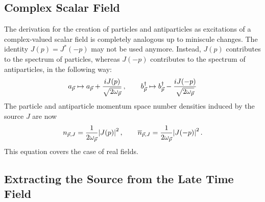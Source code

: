 \subsection{Complex Scalar Field}

The derivation for the creation of particles and antiparticles as excitations of a complex-valued scalar field is completely analogous up to miniscule changes. The identity ${J(p)=J^*(-p)}$ may not be used anymore. Instead, $J(p)$ contributes to the spectrum of particles, whereas $J(-p)$ contributes to the spectrum of antiparticles, in the following way:
\begin{equation}
    a_{\vec{p}}\mapsto a_{\vec{p}}+\frac{{i} J(p)}{\sqrt{2\omega_{\vec{p}}}}\,,\qquad b_{\vec{p}}^\dagger\mapsto b_{\vec{p}}^\dagger-\frac{{i} J(-p)}{\sqrt{2\omega_{\vec{p}}}}
\end{equation}
The particle and antiparticle momentum space number densities induced by the source $J$ are now
\begin{equation}
    n_{\vec{p},J}=\frac{1}{2\omega_{\vec{p}}}{\vert J(p)\vert}^2\,,\qquad \overline{n}_{\vec{p},J}=\frac{1}{2\omega_{\vec{p}}}{\vert J(-p)\vert}^2\,.
    \label{eq:SpectraFromSource}
\end{equation}
This equation covers the case of real fields.

\subsection{Extracting the Source from the Late Time Field}

